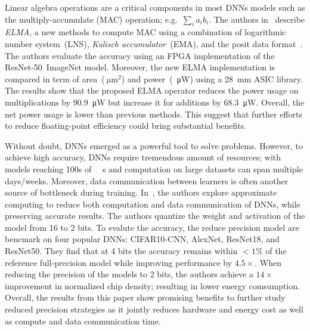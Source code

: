 Linear algebra operations are a critical components in most DNNs models such as 
the multiply-accumulate (MAC) operation; e.g.~$\sum_{i}a_{i}b_{i}$.
The authors in~\cite{Johnson2018-up} describe \textit{ELMA}, a new methods to compute MAC using a combination of logarithmic 
number system~(LNS), \textit{Kulisch accumulator}~(EMA), and the posit data format~\cite{Gustafson2017-wo}.
The authors evaluate the accuracy using an FPGA implementation of the ResNet-50~ImageNet model.
Moreover, the new ELMA implementation is compared in term of area~($\SI{}{\micro\metre}^2$)
and power~(\SI{}{\micro\watt}) using a \SI{28}{\milli\metre} ASIC library.
The results show that the proposed ELMA operator reduces the power usage on 
multiplications by \SI{90.9}{\micro\watt} but increase it for additions by \SI{68.3}{\micro\watt}.
Overall, the net power usage is lower than previous methods.
This suggest that further efforts to reduce floating-point efficiency could bring substantial benefits.

Without doubt, DNNs emerged as a powerful tool to solve problems.
However, to achieve high accuracy, DNNs require tremendous amount of resources;
with models reaching 100s of \SI{}{\mega\byte}s and computation on large datasets can span multiple days/weeks.
Moreover, data communication between learners is often another source of bottleneck during training.
In~\cite{Chen2018-an}, the authors explore approximate computing to reduce both 
computation and data communication of DNNs, while preserving accurate results.
The authors quantize the weight and activation of the model from 16 to 2 bits.
To evalute the accuracy, the reduce precision model are bencmark on four popular DNNs: CIFAR10-CNN, AlexNet, ResNet18, and ResNet50.
They find that at 4 bits the accuracy remains within $<1\%$ of the reference 
full-precision model while improving performance by $4.5\times$.
When reducing the precision of the models to 2 bits, the authors achieve a $14\times$
improvement in normalized chip density; resulting in lower energy comsumption.
Overall, the results from this paper show promising benefits to further study reduced 
precision strategies as it jointly reduces hardware and energy cost as well as compute and data communication time.

